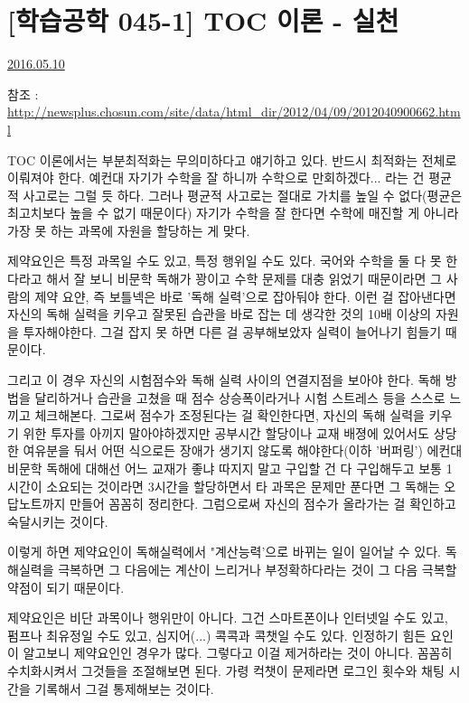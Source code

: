 \section{[학습공학 045-1] TOC 이론 - 실천}
\href{https://www.kockoc.com/Apoc/767346}{2016.05.10}

\vspace{5mm}

참조 : \url{http://newsplus.chosun.com/site/data/html_dir/2012/04/09/2012040900662.html}
\vspace{5mm}

TOC 이론에서는 부분최적화는 무의미하다고 얘기하고 있다.
반드시 최적화는 전체로 이뤄져야 한다.
예컨대 자기가 수학을 잘 하니까 수학으로 만회하겠다... 라는 건 평균적 사고로는 그럴 듯 하다.
그러나 평균적 사고로는 절대로 가치를 높일 수 없다(평균은 최고치보다 높을 수 없기 때문이다)
자기가 수학을 잘 한다면 수학에 매진할 게 아니라 가장 못 하는 과목에 자원을 할당하는 게 맞다.
\vspace{5mm}

제약요인은 특정 과목일 수도 있고, 특정 행위일 수도 있다.
국어와 수학을 둘 다 못 한다라고 해서 잘 보니 비문학 독해가 꽝이고 수학 문제를 대충 읽었기 때문이라면
그 사람의 제약 요얀, 즉 보틀넥은 바로 '독해 실력'으로 잡아둬야 한다.
이런 걸 잡아낸다면 자신의 독해 실력을 키우고 잘못된 습관을 바로 잡는 데 생각한 것의 10배 이상의 자원을 투자해야한다.
그걸 잡지 못 하면 다른 걸 공부해보았자 실력이 늘어나기 힘들기 때문이다.
\vspace{5mm}

그리고 이 경우 자신의 시험점수와 독해 실력 사이의 연결지점을 보아야 한다.
독해 방법을 달리하거나 습관을 고쳤을 때 점수 상승폭이라거나 시험 스트레스 등을 스스로 느끼고 체크해본다.
그로써 점수가 조정된다는 걸 확인한다면, 자신의 독해 실력을 키우기 위한 투자를 아끼지 말아야하겠지만
공부시간 할당이나 교재 배졍에 있어서도 상당한 여유분을 둬서 어떤 식으로든 장애가 생기지 않도록 해야한다(이하 '버퍼링')
에컨대 비문학 독해에 대해선 어느 교재가 좋냐 따지지 말고 구입할 건 다 구입해두고
보통 1시간이 소요되는 것이라면 3시간을 할당하면서 타 과목은 문제만 푼다면 그 독해는 오답노트까지 만들어 꼼꼼히 정리한다.
그럼으로써 자신의 점수가 올라가는 걸 확인하고 숙달시키는 것이다.
\vspace{5mm}

이렇게 하면 제약요인이 독해실력에서 "계산능력'으로 바뀌는 일이 일어날 수 있다.
독해실력을 극복하면 그 다음에는 계산이 느리거나 부정확하다라는 것이 그 다음 극복할 약점이 되기 때문이다.
\vspace{5mm}

제약요인은 비단 과목이나 행위만이 아니다.
그건 스마트폰이나 인터넷일 수도 있고, 펌프나 최유정일 수도 있고, 심지어(...) 콕콕과 콕챗일 수도 있다.
인정하기 힘든 요인이 알고보니 제약요인인 경우가 많다. 그렇다고 이걸 제거하라는 것이 아니다.
꼼꼼히 수치화시켜서 그것들을 조절해보면 된다. 가령 컥챗이 문제라면 로그인 횟수와 채팅 시간을 기록해서 그걸 통제해보는 것이다.
\vspace{5mm}

